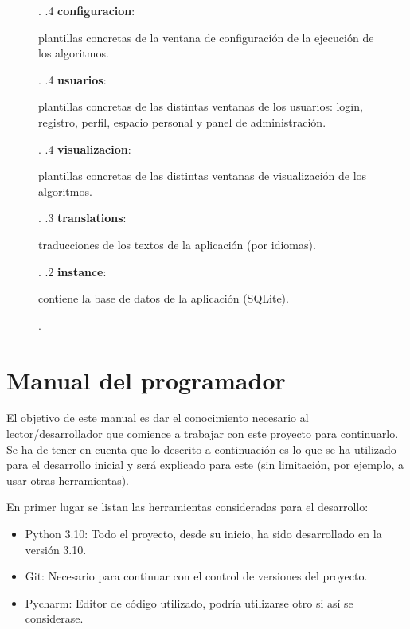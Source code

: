\begin{figure}[H]
{\begin{minipage}[t]{10cm}
        \end{minipage}.
        .4 \textbf{configuracion}: \begin{minipage}[t]{10cm}
            plantillas concretas de la ventana de configuración de la ejecución de los algoritmos{.}\\
        \end{minipage}.
        .4 \textbf{usuarios}: \begin{minipage}[t]{10cm}
            plantillas concretas de las distintas ventanas de los usuarios: login, registro, perfil, espacio personal y panel de administración{.}\\
        \end{minipage}.
        .4 \textbf{visualizacion}: \begin{minipage}[t]{10cm}
            plantillas concretas de las distintas ventanas de visualización de los algoritmos{.}\\
        \end{minipage}.
        .3 \textbf{translations}: \begin{minipage}[t]{10cm}
            traducciones de los textos de la aplicación (por idiomas){.}\\
        \end{minipage}. 
        .2 \textbf{instance}: \begin{minipage}[t]{10cm} contiene
        la base de datos de la aplicación (SQLite){.}\\
            \end{minipage}.
    }
\end{figure}

\section{Manual del programador}
El objetivo de este manual es dar el conocimiento necesario al
lector/desarrollador que comience a trabajar con este proyecto para continuarlo.
Se ha de tener en cuenta que lo descrito a continuación es lo que se ha
utilizado para el desarrollo inicial y será explicado para este (sin limitación,
por ejemplo, a usar otras herramientas).

En primer lugar se listan las herramientas consideradas para el desarrollo:
\begin{itemize}
    \item Python 3.10: Todo el proyecto, desde su inicio, ha sido desarrollado en la versión 3.10.
    \item Git: Necesario para continuar con el control de versiones del proyecto.
    \item Pycharm: Editor de código utilizado, podría utilizarse otro si así se considerase.
\end{itemize}

